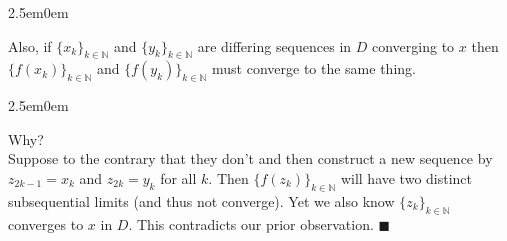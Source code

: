 \documentclass{book}
\newcommand{\hTwo}{%
\color{Black}%
   \fontsize{13}{15}\selectfont%
}
\newcommand{\pracTwo}{
   \color{Orange}%
   \fontsize{12}{14}\selectfont%
}
\newcommand{\exPPP}{%
   \color{VioletRed}%
   \fontsize{12}{14}\selectfont%
}
\newenvironment{myIndent}{%
   \begin{adjustwidth}{2.5em}{0em}%
}{%
   \end{adjustwidth}%
}
\newcommand{\mySepTwo}[1][.]{%
   {\noindent\color{#1}{\rule{6.5in}{0.5mm}}}\\%
}
\begin{document}
\begin{myIndent}
	Also, if $\{x_k\}_{k \in \mathbb{N}}$ and $\{y_k\}_{k \in \mathbb{N}}$ are differing sequences in $D$ converging to $x$ then $\{f(x_k)\}_{k \in \mathbb{N}}$ and $\{f(y_k)\}_{k \in \mathbb{N}}$ must converge to the same thing.
	\begin{myIndent}\exPPP
		Why?\\
		Suppose to the contrary that they don't and then construct a new sequence by\\ $z_{2k - 1} = x_k$ and $z_{2k} = y_k$ for all $k$. Then $\{f(z_k)\}_{k \in \mathbb{N}}$ will have two distinct\\ subsequential limits (and thus not converge). Yet we also know $\{z_k\}_{k \in \mathbb{N}}$ converges to $x$ in $D$. This contradicts our prior observation. \pracTwo $\blacksquare$
	\end{myIndent}
\end{myIndent}
\mySepTwo\hTwo
\end{document}
